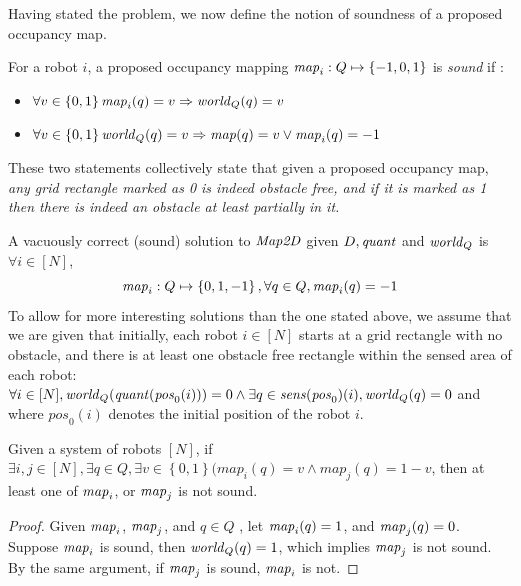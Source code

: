 
Having stated the problem, we now define the notion of soundness of a proposed occupancy map.
\begin{definition}
    \label{soundness}
    For a robot $i$, a proposed occupancy mapping $\mathit{map}_i: Q \mapsto \left\{-1,0,1\right\}$ is \emph{sound} if :
    \begin{itemize}
        \item $\forall v \in \left\{0,1\right\} \mathit{map}_i(q) = v \Rightarrow \mathit{world}_Q(q)  = v$
        \item $\forall v \in \left\{0,1\right\}\mathit{world}_Q(q) = v \Rightarrow \mathit{map}(q) = v \vee \mathit{map}_i(q) = -1$
    \end{itemize}
\end{definition}


These two statements collectively state that given a proposed occupancy map, \emph{any grid rectangle marked as 0 is indeed obstacle free, and if it is marked as 1 then there is indeed an obstacle at least partially in it.}

A vacuously correct (sound) solution to $\mathit{Map2D}$ given $D, \mathit{quant}$ and $\mathit{world}_Q$ is $\forall i \in [N]$, $$\mathit{map}_i : Q \mapsto \left\{0,1,-1\right\}, \forall  q \in Q , \mathit{map}_i(q)= -1$$ To allow for more interesting solutions than the one stated above, we assume that we are given that initially, each robot $i\in[N]$ starts at a grid rectangle with no obstacle, and there is at least one obstacle free rectangle within the sensed area of each robot:
$\forall i \in [N], \mathit{world}_Q(\mathit{quant}(\mathit{pos}_0(i))) = 0 \wedge \exists q \in \mathit{sens}(\mathit{pos}_0)(i), \mathit{world}_Q(q) = 0 $ and
where $\mathit{pos}_0(i)$ denotes the initial position of the robot $i$.




\begin{lemma}
    \label{comptbl}
    Given a system of robots $[N]$, if $\exists i , j \in [N], \exists  q \in Q, \exists v \in \left\{0,1\right\} (map_i(q) = v \wedge
    map_j(q) = 1 - v $, then at least one of $\mathit{map}_i$, or $\mathit{map}_j$ is not sound.
\end{lemma}

\begin{proof}
    Given $\mathit{map}_i$, $\mathit{map}_j$, and $q\in Q$ , let $\mathit{map}_i(q) = 1$, and $\mathit{map}_j(q) = 0$. Suppose $\mathit{map}_i$ is sound, then $\mathit{world}_Q(q) = 1$, which implies $\mathit{map}_j$ is not sound. By the same argument, if $\mathit{map}_j$ is sound, $\mathit{map}_i$ is not.
\end{proof}

